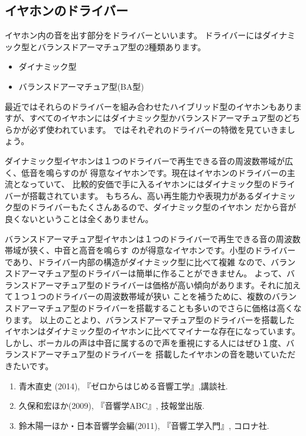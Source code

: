 \documentclass[11pt,b5paper,papersize,dvipdfmx]{jsbook}
\begin{document}
%
\newpage
\subsection{イヤホンのドライバー}
イヤホン内の音を出す部分をドライバーといいます。
ドライバーにはダイナミック型とバランスドアーマチュア型の2種類あります。\par
\begin{itemize}
  \item ダイナミック型
  \item バランスドアーマチュア型(BA型)
\end{itemize}
最近ではそれらのドライバーを組み合わせたハイブリッド型のイヤホンもありますが、すべてのイヤホンにはダイナミック型かバランスドアーマチュア型のどちらかが必ず使われています。
ではそれぞれのドライバーの特徴を見ていきましょう。\par
ダイナミック型イヤホンは１つのドライバーで再生できる音の周波数帯域が広く、低音を鳴らすのが
得意なイヤホンです。現在はイヤホンのドライバーの主流となっていて、
比較的安価で手に入るイヤホンにはダイナミック型のドライバーが搭載されています。
もちろん、高い再生能力や表現力があるダイナミック型のドライバーもたくさんあるので、ダイナミック型のイヤホン
だから音が良くないということは全くありません。\par
バランスドアーマチュア型イヤホンは１つのドライバーで再生できる音の周波数帯域が狭く、中音と高音を鳴らす
のが得意なイヤホンです。小型のドライバーであり、ドライバー内部の構造がダイナミック型に比べて複雑
なので、バランスドアーマチュア型のドライバーは簡単に作ることができません。
よって、バランスドアーマチュア型のドライバーは価格が高い傾向があります。それに加えて１つ１つのドライバーの周波数帯域が狭い
ことを補うために、複数のバランスドアーマチュア型のドライバーを搭載することも多いのでさらに価格は高くなります。
以上のことより、バランスドアーマチュア型のドライバーを搭載したイヤホンはダイナミック型のイヤホンに比べてマイナーな存在になっています。
しかし、ボーカルの声は中音に属するので声を重視にする人にはぜひ１度、バランスドアーマチュア型のドライバーを
搭載したイヤホンの音を聴いていただきたいです。


\sanko
\begin{enumerate}
  \item 青木直史 (2014), 『ゼロからはじめる音響工学』,講談社.
  \item 久保和宏ほか(2009), 『音響学ABC』, 技報堂出版.
  \item 鈴木陽一ほか・日本音響学会編(2011), 『音響工学入門』, コロナ社.
\end{enumerate}
\end{document}
